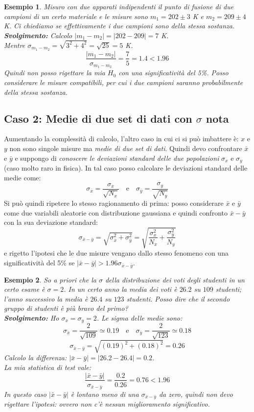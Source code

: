 \documentclass[openany,a4paper,12pt]{book}
\newtheorem{esempio}{Esempio}
\theoremstyle{remark}
\begin{document}
\begin{esempio}
Misuro con due apparati indipendenti il punto di fusione di due campioni di un certo materiale e le misure sono $m_1 = 202 \pm 3$ K e $m_2 = 209 \pm 4$ K. Ci chiediamo se effettivamente i due campioni sono della stessa sostanza. \\
\textbf{Svolgimento:} Calcolo $|m_1 - m_2| = |202 - 209| = 7$ K. \\
Mentre $\sigma_{m_1-m_2} = \sqrt{3^2 + 4^2} = \sqrt{25} = 5$ K.
$$ \frac{|m_1-m_2|}{\sigma_{m_1-m_2}} = \frac{7}{5} = 1.4 < 1.96 $$
Quindi non posso rigettare la mia $H_0$ con una significatività del 5\%. Posso considerare le misure compatibili, per cui i due campioni saranno probabilmente della stessa sostanza.
\end{esempio}

\subsection*{Caso 2: Medie di due set di dati con $\sigma$ nota}
Aumentando la complessità di calcolo, l'altro caso in cui ci si può imbattere è: $x$ e $y$ non sono singole misure ma \textit{medie di due set di dati}. Quindi devo confrontare $\bar{x}$ e $\bar{y}$ e suppongo di \textit{conoscere le deviazioni standard delle due popolazioni} $\sigma_x$ e $\sigma_y$ (caso molto raro in fisica). 
In tal caso posso calcolare le deviazioni standard delle medie come:
$$ \sigma_{\bar{x}} = \frac{\sigma_x}{\sqrt{N_x}} \quad \text{e} \quad \sigma_{\bar{y}} = \frac{\sigma_y}{\sqrt{N_y}} $$
Si può quindi ripetere lo stesso ragionamento di prima: posso considerare $\bar{x}$ e $\bar{y}$ come due variabili aleatorie con distribuzione gaussiana e quindi confronto $\bar{x}-\bar{y}$ con la sua deviazione standard:
$$ \sigma_{\bar{x}-\bar{y}} = \sqrt{\sigma_{\bar{x}}^2 + \sigma_{\bar{y}}^2} = \sqrt{\frac{\sigma_x^2}{N_x} + \frac{\sigma_y^2}{N_y}} $$
e rigetto l'ipotesi che le due misure vengano dallo stesso fenomeno con una significatività del 5\% se $|\bar{x}-\bar{y}| > 1.96 \sigma_{\bar{x}-\bar{y}}$.

\begin{esempio}
So a priori che la $\sigma$ della distribuzione dei voti degli studenti in un certo esame è $\sigma = 2$. In un certo anno la media dei voti è $26.2$ su $109$ studenti; l'anno successivo la media è $26.4$ su $123$ studenti. Posso dire che il secondo gruppo di studenti è più bravo del primo? \\
\textbf{Svolgimento:} Ho $\sigma_x = \sigma_y = 2$. Le sigma delle medie sono:
$$ \sigma_{\bar{x}} = \frac{2}{\sqrt{109}} \simeq 0.19 \quad \text{e} \quad \sigma_{\bar{y}} = \frac{2}{\sqrt{123}} \simeq 0.18 $$
$$ \sigma_{\bar{x}-\bar{y}} = \sqrt{(0.19)^2 + (0.18)^2} = 0.26 $$
Calcolo la differenza: $|\bar{x}-\bar{y}| = |26.2 - 26.4| = 0.2$. \\
La mia statistica di test vale:
$$ \frac{|\bar{x}-\bar{y}|}{\sigma_{\bar{x}-\bar{y}}} = \frac{0.2}{0.26} = 0.76 < 1.96 $$
In questo caso $|\bar{x}-\bar{y}|$ è lontano meno di una $\sigma_{\bar{x}-\bar{y}}$ da zero, quindi non devo rigettare l'ipotesi: ovvero non c'è nessun miglioramento significativo.
\end{esempio}
\end{document}
